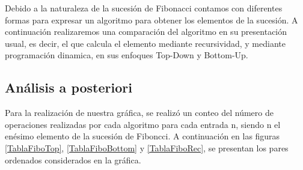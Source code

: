 Debido a la naturaleza de la sucesión de Fibonacci contamos con diferentes formas para expresar un algoritmo para obtener los elementos de la sucesión. A continuación realizaremos una comparación del algoritmo en su presentación usual, es decir, el que calcula el elemento mediante recursividad, y mediante programación dinamica, en sus enfoques Top-Down y Bottom-Up.

\subsection*{Análisis a posteriori}
    Para la realización de nuestra gráfica, se realizó un conteo del número de operaciones realizadas por cada algoritmo para cada entrada n, siendo n el enésimo elemento de la sucesión de Fiboncci. A continuación en las figuras \ref{TablaFiboTop}, \ref{TablaFiboBottom} y \ref{TablaFiboRec}, se presentan los pares ordenados considerados en la gráfica.
    
